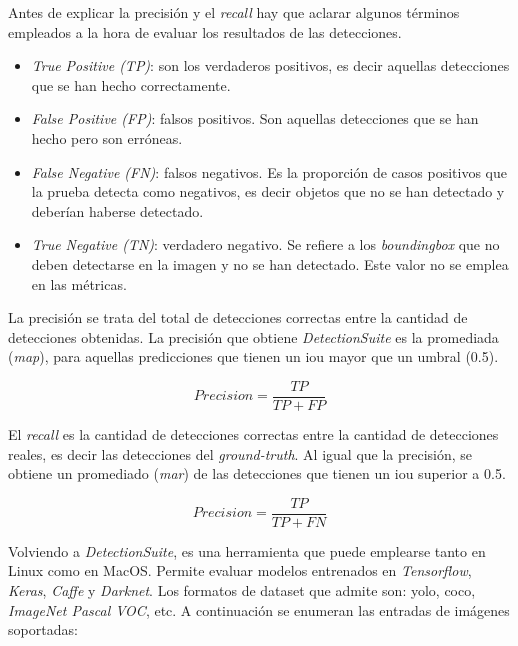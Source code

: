 Antes de explicar la precisión y el \textit{recall} hay que aclarar algunos términos empleados a la hora de evaluar los resultados de las detecciones. 

\begin{itemize}
    \item \textit{True Positive (TP)}: son los verdaderos positivos, es decir aquellas detecciones que se han hecho correctamente.
    \item \textit{False Positive (FP)}: falsos positivos. Son aquellas detecciones que se han hecho pero son erróneas.
    \item \textit{False Negative (FN)}: falsos negativos. Es la proporción de casos positivos que la prueba detecta como negativos, es decir objetos que no se han detectado y deberían haberse detectado.
    \item \textit{True Negative (TN)}: verdadero negativo. Se refiere a los \textit{boundingbox} que no deben detectarse en la imagen y no se han detectado. Este valor no se emplea en las métricas.
\end{itemize}

La precisión se trata del total de detecciones correctas entre la cantidad de detecciones obtenidas. La precisión que obtiene \textit{DetectionSuite} es la promediada (\textit{\acrfull{map}}), para aquellas predicciones que tienen un \acrshort{iou} mayor que un umbral (0.5).

\begin{equation}\label{precision}
Precision = \frac{TP}{TP + FP}
\end{equation}

El \textit{recall} es la cantidad de detecciones correctas entre la cantidad de detecciones reales, es decir las detecciones del \textit{ground-truth}. Al igual que la precisión, se obtiene un promediado (\textit{\acrfull{mar}}) de las detecciones que tienen un \acrshort{iou} superior a 0.5.

\begin{equation}\label{recall}
Precision = \frac{TP}{TP + FN}
\end{equation}

Volviendo a \textit{DetectionSuite}, es una herramienta que puede emplearse tanto en Linux como en MacOS. Permite evaluar modelos entrenados en \textit{Tensorflow}, \textit{Keras}, \textit{Caffe} y \textit{Darknet}. Los formatos de dataset que admite son:  \acrshort{yolo}, \acrshort{coco}, \textit{ImageNet Pascal VOC}, etc. A continuación se enumeran las entradas de imágenes soportadas:

